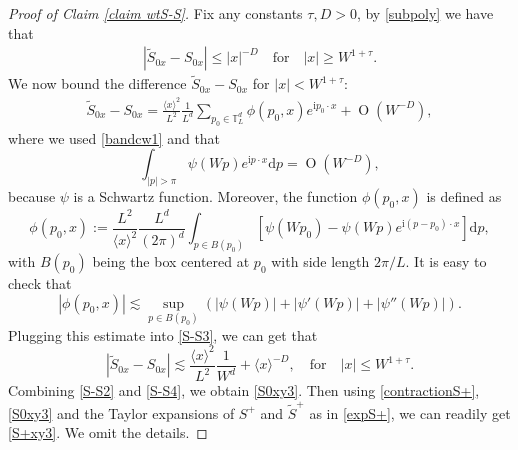 \documentclass{article}
\newcommand{\1}{\mathds{1}}
\numberwithin{equation}{section}
\newcommand{\be}{\begin{equation}}
\newcommand{\ee}{\end{equation}}
\newcommand{\e}{{\varepsilon}}
\newcommand{\wt}{\widetilde}
\newcommand{\ii}{\mathrm{i}} %
\newcommand{\dd}{\mathrm{d}}
\renewcommand{\leq}{\leqslant}
\renewcommand{\geq}{\geqslant}
\renewcommand{\le}{\leq}
\renewcommand{\ge}{\geq}
\newcommand{\Z}{\mathbb{Z}}
\DeclareMathOperator{\OO}{O}
\theoremstyle{plain} %
\theoremstyle{remark}
\begin{document}
\begin{proof}[Proof of Claim \ref{claim wtS-S}]
 Fix any constants $\tau, D>0$, by \eqref{subpoly} we have that 
\begin{align}\label{S-S2} \left|\wt S_{0x} - S_{0x}\right| \le |x|^{-D} \quad \text{for}\quad  |x|\ge  W^{1+\tau}.
\end{align}
We now bound the difference $ \wt S_{0x}-S_{0x} $ for $|x|< W^{1+\tau}$:
\begin{align}\label{S-S3}
	\wt S _{0x}  - S_{0x}  =\frac{\langle x\rangle^2}{L^2} \frac1{L^d}\sum_{p_0\in \mathbb T_L^d}\phi(p_0, x) e^{\ii p_0\cdot x} + \OO(W^{-D})
	,\end{align} 
where we used \eqref{bandcw1} and that 
$$ \int_{|p| > \pi} \psi(Wp)e^{\ii p\cdot x} \dd p =\OO(W^{-D}),$$
because $\psi$ is a Schwartz function.  Moreover, the function $\phi(p_0, x)$ is defined as 
$$\phi(p_0, x):=\frac{L^2}{\langle x\rangle^2} \frac{L^d}{(2\pi)^d}\int_{p\in B(p_0)} \left[ \psi(Wp_0)- \psi(Wp)e^{\ii (p-p_0)\cdot x} \right] \dd p, $$
with $B(p_0)$ being the box centered at $p_0$ with side length $2\pi/L$. It is easy to check that 
$$|\phi(p_0, x)|\lesssim  \sup_{p\in B(p_0)}\left(|\psi(Wp)|+ |\psi'(Wp)|+ |\psi''(Wp)|\right).$$ 
Plugging this estimate into \eqref{S-S3}, we can get that 
\be\label{S-S4}
\left|\wt S_{0x}  - S_{0x} \right| \lesssim \frac{\langle x\rangle^2}{L^2} \frac{1}{W^d}+ \langle x\rangle^{-D},\quad \text{for}\quad |x|\le  W^{1+\tau}.
\ee
Combining \eqref{S-S2} and \eqref{S-S4}, we obtain \eqref{S0xy3}. Then using \eqref{contractionS+}, \eqref{S0xy3} and the Taylor expansions of $S^+$ and $\wt S^+$ as in \eqref{expS+}, we can readily get \eqref{S+xy3}. We omit the details.


\end{proof}
\end{document}
